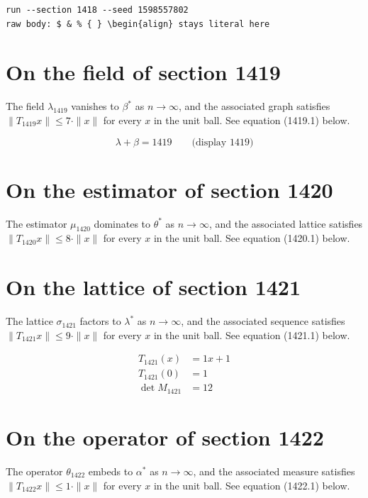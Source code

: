\documentclass{article}
\begin{document}
\begin{verbatim}
run --section 1418 --seed 1598557802
raw body: $ & % { } \begin{align} stays literal here
\end{verbatim}

\section{On the field of section 1419}
The field $\lambda_{1419}$ vanishes to $\beta^{*}$ as $n \to \infty$,
and the associated graph satisfies $\|T_{1419} x\| \leq 7 \cdot \|x\|$
for every $x$ in the unit ball. See equation (1419.1) below.

$$
\lambda + \beta = 1419 \qquad \text{(display 1419)}
$$

\section{On the estimator of section 1420}
The estimator $\mu_{1420}$ dominates to $\theta^{*}$ as $n \to \infty$,
and the associated lattice satisfies $\|T_{1420} x\| \leq 8 \cdot \|x\|$
for every $x$ in the unit ball. See equation (1420.1) below.

\section{On the lattice of section 1421}
The lattice $\sigma_{1421}$ factors to $\lambda^{*}$ as $n \to \infty$,
and the associated sequence satisfies $\|T_{1421} x\| \leq 9 \cdot \|x\|$
for every $x$ in the unit ball. See equation (1421.1) below.

\begin{align}
T_{1421}(x) &= 1 x + 1 \\
T_{1421}(0) &= 1 \\
\det M_{1421} &= 12
\end{align}

\section{On the operator of section 1422}
The operator $\theta_{1422}$ embeds to $\alpha^{*}$ as $n \to \infty$,
and the associated measure satisfies $\|T_{1422} x\| \leq 1 \cdot \|x\|$
for every $x$ in the unit ball. See equation (1422.1) below.
\end{document}
